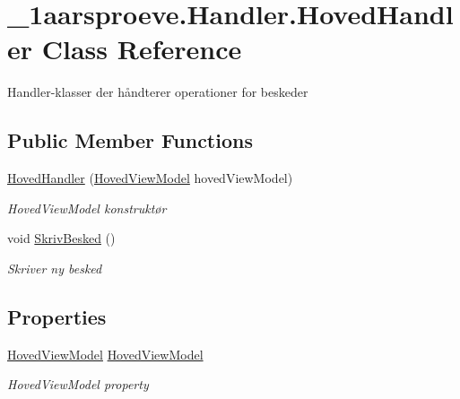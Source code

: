 \hypertarget{class__1aarsproeve_1_1_handler_1_1_hoved_handler}{}\section{\+\_\+1aarsproeve.\+Handler.\+Hoved\+Handler Class Reference}
\label{class__1aarsproeve_1_1_handler_1_1_hoved_handler}


Handler-\/klasser der håndterer operationer for beskeder  


\subsection*{Public Member Functions}
\begin{DoxyCompactItemize}
\item 
\hyperlink{class__1aarsproeve_1_1_handler_1_1_hoved_handler_ad0d900d482d4780d1a75a91eea9b5a4f}{Hoved\+Handler} (\hyperlink{class__1aarsproeve_1_1_view_model_1_1_hoved_view_model}{Hoved\+View\+Model} hoved\+View\+Model)
\begin{DoxyCompactList}\small\item\em Hoved\+View\+Model konstruktør \end{DoxyCompactList}\item 
void \hyperlink{class__1aarsproeve_1_1_handler_1_1_hoved_handler_a8b177c4c354c1657f3de1a240ce63334}{Skriv\+Besked} ()
\begin{DoxyCompactList}\small\item\em Skriver ny besked \end{DoxyCompactList}\end{DoxyCompactItemize}
\subsection*{Properties}
\begin{DoxyCompactItemize}
\item 
\hyperlink{class__1aarsproeve_1_1_view_model_1_1_hoved_view_model}{Hoved\+View\+Model} \hyperlink{class__1aarsproeve_1_1_handler_1_1_hoved_handler_a967641be7f28016b11d379c950e5f1a3}{Hoved\+View\+Model}
\begin{DoxyCompactList}\small\item\em Hoved\+View\+Model property \end{DoxyCompactList}\end{DoxyCompactItemize}



